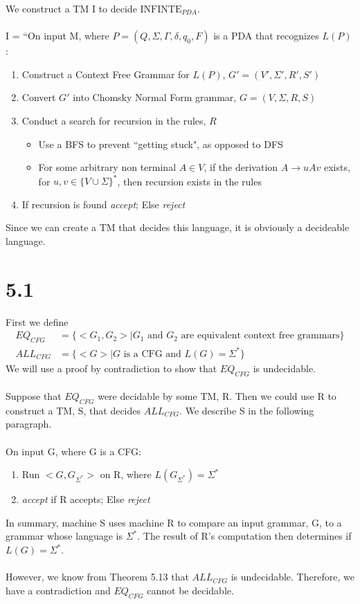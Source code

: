 \documentclass{article}
\begin{document}
We construct a TM I to decide $\textrm{INFINTE}_{PDA}$. \\\\
I = ``On input M, where $P=(Q,\Sigma,\Gamma,\delta,q_0,F)$ is a PDA that recognizes $L(P)$:
\begin{enumerate}
    \item Construct a Context Free Grammar for $L(P)$, $G'=(V',\Sigma',R',S')$
    \item Convert $G'$ into Chomsky Normal Form grammar, $G=(V,\Sigma,R,S)$
    \item Conduct a search for recursion in the rules, $R$
    \begin{itemize}
    	\item Use a BFS to prevent ``getting stuck", as opposed to DFS
	\item For some arbitrary non terminal $A \in V$, if the derivation $A \rightarrow uAv$ exists, for $u,v \in \{ V \cup \Sigma \}^*$, then recursion exists in the rules
    \end{itemize}
    \item If recursion is found \textit{accept}; Else \textit{reject}
\end{enumerate}
Since we can create a TM that decides this language, it is obviously a decideable language.

\section*{5.1}

First we define
\begin{align*}
    EQ_{CFG} &= \{ <G_1, G_2> | G_1 \textrm{ and } G_2 \textrm{ are equivalent context free grammars} \}\\
    ALL_{CFG} &= \{ <G> | G \textrm{ is a CFG and } L(G) = \Sigma^* \} 
\end{align*} 
We will use a proof by contradiction to show that $EQ_{CFG}$ is undecidable.\\\\
Suppose that $EQ_{CFG}$ were decidable by some TM, R. Then we could use R to construct a TM, S, that decides $ALL_{CFG}$. We describe S in the following paragraph.\\\\
On input G, where G is a CFG:
\begin{enumerate}
    \item Run $<G, G_{\Sigma^*}>$ on R, where $L(G_{\Sigma^*}) = \Sigma^*$
    \item \textit{accept} if R accepts; Else \textit{reject}
\end{enumerate}
In summary, machine S uses machine R to compare an input grammar, G, to a grammar whose language is $\Sigma^*$. The result of R's computation then determines if $L(G) = \Sigma^*$.\\\\
However, we know from Theorem 5.13 that $ALL_{CFG}$ is undecidable. Therefore, we have a contradiction and $EQ_{CFG}$ cannot be decidable.
\end{document}
